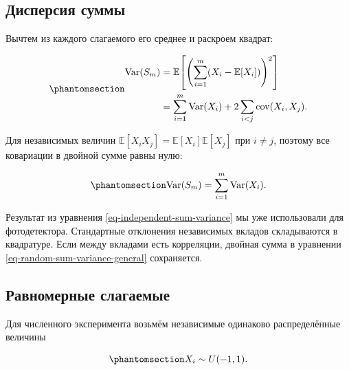 \documentclass[
  russian,
  11pt,
  a4paper,
  open=any]{scrbook}
\begin{document}
\begin{bookderivation}

\subsection{Дисперсия
суммы}\label{ux434ux438ux441ux43fux435ux440ux441ux438ux44f-ux441ux443ux43cux43cux44b}

Вычтем из каждого слагаемого его среднее и раскроем квадрат:

\begin{equation}\protect\phantomsection\label{eq-random-sum-variance-general}{
\begin{aligned}
\operatorname{Var}(S_m)
&=\mathbb E\!\left[
\left(\sum_{i=1}^{m}(X_i-\mathbb E[X_i])\right)^2
\right]\\
&=\sum_{i=1}^{m}\operatorname{Var}(X_i)
+2\sum_{i<j}\operatorname{cov}(X_i,X_j).
\end{aligned}
}\end{equation}

Для независимых величин
\(\mathbb E[X_iX_j]=\mathbb E[X_i]\mathbb E[X_j]\) при \(i\ne j\),
поэтому все ковариации в двойной сумме равны нулю:

\begin{equation}\protect\phantomsection\label{eq-independent-sum-variance}{
\operatorname{Var}(S_m)
=\sum_{i=1}^{m}\operatorname{Var}(X_i).
}\end{equation}

\end{bookderivation}

Результат из уравнения \ref{eq-independent-sum-variance} мы уже
использовали для фотодетектора. Стандартные отклонения независимых
вкладов складываются в квадратуре. Если между вкладами есть корреляции,
двойная сумма в уравнении \ref{eq-random-sum-variance-general}
сохраняется.

\subsection{Равномерные
слагаемые}\label{ux440ux430ux432ux43dux43eux43cux435ux440ux43dux44bux435-ux441ux43bux430ux433ux430ux435ux43cux44bux435}

Для численного эксперимента возьмём независимые одинаково распределённые
величины

\begin{equation}\protect\phantomsection\label{eq-uniform-summands}{
X_i\sim U(-1,1).
}\end{equation}
\end{document}
